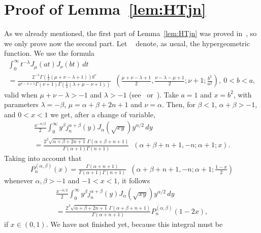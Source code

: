 \documentclass[12pt,leqno]{amsart}
\theoremstyle{plain}
\newcommand{\hf}{\mathop{{}_2F_1}} %
\begin{document}
\section{Proof of Lemma~\ref{lem:HTjn}}
\label{sec:proofHTjn}

As we already mentioned, the first part of Lemma~\ref{lem:HTjn} was proved
in~\cite{CGPV}, so we only prove now the second part. Let $\hf$ denote, as
usual, the hypergeometric function. We use the formula
\begin{multline*}
    \int_0^\infty t^{-\lambda} J_\mu(at) J_\nu(bt)\,dt
    \\
    = \tfrac{2^{-\lambda} \Gamma(\frac12(\mu+\nu-\lambda+1))b^\nu}
       {a^{\nu-\lambda+1} \Gamma(\nu+1)\Gamma(\frac12(\lambda+\mu-\nu+1))}
     \hf\left( \tfrac{\mu+\nu-\lambda+1}2,
       \tfrac{\nu-\lambda-\mu+1}2; \nu+1; \tfrac{b^2}{a^2} \right),
     \ 0<b<a,
\end{multline*}
valid when $\mu+\nu-\lambda>-1$ and $\lambda>-1$ (see~\cite[8.11 (9),
p.~48]{E-TIT} or~\cite[13.4 (2), p. 401]{Wat}). Take $a=1$ and $x=b^2$, with
parameters $\lambda=-\beta$, $\mu=\alpha+\beta+2n+1$ and $\nu=\alpha$. Then,
for $\beta<1$, $\alpha+\beta>-1$, and $0 < x < 1$ we get, after a change of
variable,
\begin{multline*}
   \frac{x^{-\alpha/2}}{2} \int_0^\infty y^\beta j_n^{\alpha+\beta}(y)
   J_\alpha(\sqrt{xy}) y^{\alpha/2} \, dy
   \\
    = \tfrac{2^\beta \sqrt{\alpha+\beta+2n+1}\,\Gamma(\alpha+\beta+n+1)}
      {\Gamma(\alpha+1) \Gamma(n+1)}
      \hf(\alpha+\beta+n+1,-n;\alpha+1;x).
\end{multline*}
Taking into account that
\begin{equation*}
    P_n^{(\alpha,\beta)}(x) =
      \tfrac{\Gamma(\alpha+n+1)}{\Gamma(\alpha+1)\Gamma(n+1)}
      \hf(\alpha+\beta+n+1, -n ; \alpha+1; \tfrac{1-x}{2})
\end{equation*}
whenever $\alpha, \beta > -1$ and $-1 < x < 1$, it follows
\begin{multline*}
   \frac{x^{-\alpha/2}}{2} \int_0^\infty y^\beta j_n^{\alpha+\beta}(y)
   J_\alpha(\sqrt{xy}) y^{\alpha/2} \, dy
   \\
    = \tfrac{2^\beta \sqrt{\alpha+\beta+2n+1}\,\Gamma(\alpha+\beta+n+1)}
      {\Gamma(\alpha+n+1)}
      P_n^{(\alpha,\beta)}(1-2x),
\end{multline*}
if $x \in (0,1)$. We have not finished yet, because this integral must be
\end{document}
